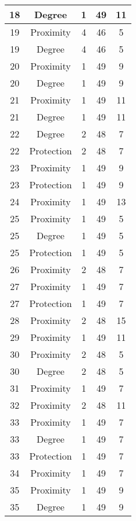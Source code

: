 \documentclass[results.tex]{subfiles}
\begin{document}
\begin{center}
\begin{tabular}{| c || c | c | c | c |}
    \hline
    18 & Degree & 1 & 49 & 11 \\ 
    \hline
    19 & Proximity & 4 & 46 & 5 \\ 
    \hline
    19 & Degree & 4 & 46 & 5 \\ 
    \hline
    20 & Proximity & 1 & 49 & 9 \\ 
    \hline
    20 & Degree & 1 & 49 & 9 \\ 
    \hline
    21 & Proximity & 1 & 49 & 11 \\ 
    \hline
    21 & Degree & 1 & 49 & 11 \\ 
    \hline
    22 & Degree & 2 & 48 & 7 \\ 
    \hline
    22 & Protection & 2 & 48 & 7 \\ 
    \hline
    23 & Proximity & 1 & 49 & 9 \\ 
    \hline
    23 & Protection & 1 & 49 & 9 \\ 
    \hline
    24 & Proximity & 1 & 49 & 13 \\ 
    \hline
    25 & Proximity & 1 & 49 & 5 \\ 
    \hline
    25 & Degree & 1 & 49 & 5 \\ 
    \hline
    25 & Protection & 1 & 49 & 5 \\ 
    \hline
    26 & Proximity & 2 & 48 & 7 \\ 
    \hline
    27 & Proximity & 1 & 49 & 7 \\ 
    \hline
    27 & Protection & 1 & 49 & 7 \\ 
    \hline
    28 & Proximity & 2 & 48 & 15 \\ 
    \hline
    29 & Proximity & 1 & 49 & 11 \\ 
    \hline
    30 & Proximity & 2 & 48 & 5 \\ 
    \hline
    30 & Degree & 2 & 48 & 5 \\ 
    \hline
    31 & Proximity & 1 & 49 & 7 \\ 
    \hline
    32 & Proximity & 2 & 48 & 11 \\ 
    \hline
    33 & Proximity & 1 & 49 & 7 \\ 
    \hline
    33 & Degree & 1 & 49 & 7 \\ 
    \hline
    33 & Protection & 1 & 49 & 7 \\ 
    \hline
    34 & Proximity & 1 & 49 & 7 \\ 
    \hline
    35 & Proximity & 1 & 49 & 9 \\ 
    \hline
    35 & Degree & 1 & 49 & 9 \\ 
    \hline

\end{tabular}
\end{center}
\end{document}
